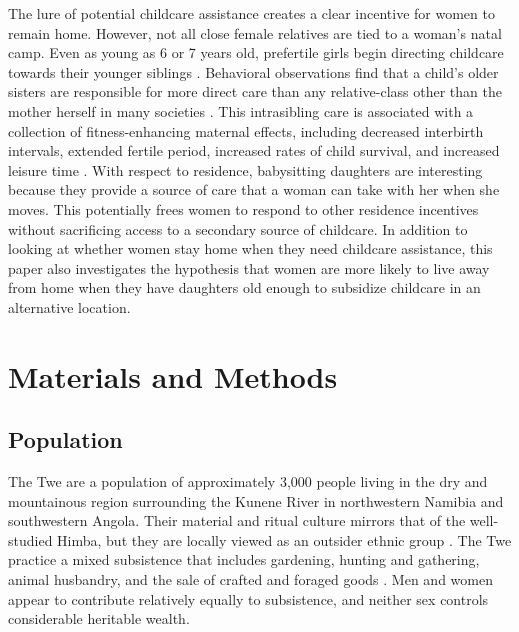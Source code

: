 \documentclass[10pt]{article}
\begin{document}
The lure of potential childcare assistance creates a clear incentive for women to remain home.  However, not all close female relatives are tied to a woman's natal camp.  Even as young as 6 or 7 years old, prefertile girls begin directing childcare towards their younger siblings \citep{zeller1987role, kramer2004reconsidering, hames1988allocation, denham1974infant, dunbar2002helping}.  Behavioral observations find that a child's older sisters are responsible for more direct care than any relative-class other than the mother herself in many societies \citep{kramer2005children}.  This intrasibling care is associated with a collection of fitness-enhancing maternal effects, including decreased interbirth intervals, extended fertile period, increased rates of child survival, and increased leisure time \citep{turke1988helpers, Bereczei2002helping, crognier2001helpers, bove2002girl}.  With respect to residence, babysitting daughters are interesting because they provide a source of care that a woman can take with her when she moves.  This potentially frees women to respond to other residence incentives without sacrificing access to a secondary source of childcare.  In addition to looking at whether women stay home when they need childcare assistance, this paper also investigates the hypothesis that women are more likely to live away from home when they have daughters old enough to subsidize childcare in an alternative location.  

\section{Materials and Methods}

\subsection{Population}

The Twe are a population of approximately 3,000 people living in the dry and mountainous region surrounding the Kunene River in northwestern Namibia and southwestern Angola.  Their material and ritual culture mirrors that of the well-studied Himba, but they are locally viewed as an outsider ethnic group \citep{estermann1976ethnography, malan1974herero, bollig2006risk}.  The Twe practice a mixed subsistence that includes gardening, hunting and gathering, animal husbandry, and the sale of crafted and foraged goods \citep{bollig2004hunters}.  Men and women appear to contribute relatively equally to subsistence, and neither sex controls considerable heritable wealth.
\end{document}
